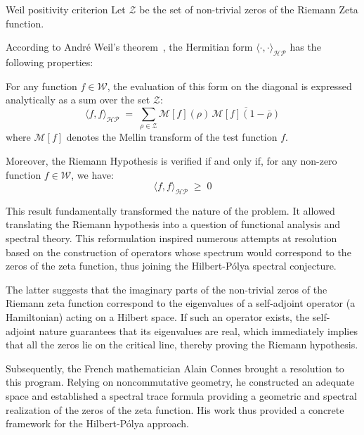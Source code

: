 \documentclass[Riemann_Hypothesis.tex]{subfiles}
\begin{document}
\begin{propositionEn}[label=pr:CriterePositiviteWeil_intro]{Weil positivity criterion}
    Let $\mathcal{Z}$ be the set of non-trivial zeros of
    the Riemann Zeta function.\par
    According to André Weil's theorem~\cite{weil1952_formules_en}, 
    the Hermitian form $\langle \cdot, \cdot \rangle_{\mathcal{HP}}$ 
    has the following properties: \par
    For any function $f \in \mathcal{W}$, the evaluation of this form on the
    diagonal is expressed analytically as a sum over the set
    $\mathcal{Z}$:
    \begin{equation*}
        \langle f, f \rangle_{\mathcal{HP}} \;=\; \sum_{\rho \in \mathcal{Z}} \mathcal{M}[f](\rho) \, \overline{\mathcal{M}[f](1 - \overline{\rho})}
    \end{equation*}
    where $\mathcal{M}[f]$ denotes the Mellin transform of the test function $f$. \par
    Moreover, the Riemann Hypothesis is verified if and only if, for any non-zero 
    function $f \in \mathcal{W}$, we have:
    \begin{equation*}
        \langle f, f \rangle_{\mathcal{HP}} \;\geq\; 0
    \end{equation*}
\end{propositionEn}

This result fundamentally transformed the nature of the problem. 
It allowed translating the Riemann hypothesis into a question of functional 
analysis and spectral theory. This reformulation inspired numerous 
attempts at resolution based on the construction of operators 
whose spectrum would correspond to the zeros of the zeta function, thus 
joining the Hilbert-Pólya spectral conjecture.\medskip\par

The latter suggests that the imaginary parts of the non-trivial zeros of the Riemann 
zeta function correspond to the eigenvalues of a self-adjoint operator 
(a Hamiltonian) acting on a Hilbert space. If such an operator exists, 
the self-adjoint nature guarantees that its eigenvalues are real, which 
immediately implies that all the zeros lie on the critical line, 
thereby proving the Riemann hypothesis.

Subsequently, the French mathematician Alain Connes brought a resolution 
to this program. Relying on noncommutative geometry, 
he constructed an adequate space and established a spectral trace formula 
providing a geometric and spectral realization of the zeros of the zeta function. 
His work thus provided a concrete framework for the Hilbert-Pólya approach.
\end{document}
